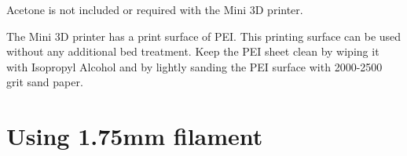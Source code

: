 {%

Acetone is not included or required with the Mini 3D printer.


The Mini 3D printer has a print surface of PEI. This printing surface can be used without any additional bed treatment. Keep the PEI sheet clean by wiping it with Isopropyl Alcohol and by lightly sanding the PEI surface with 2000-2500 grit sand paper.




\section{Using 1.75mm filament}

}
